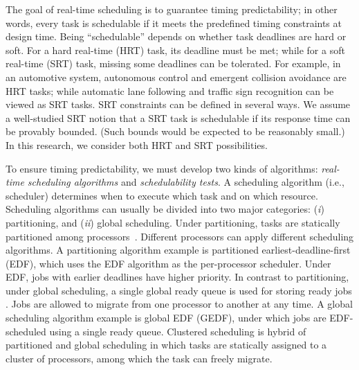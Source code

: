 The goal of real-time scheduling is to guarantee timing predictability; in other words, every task is schedulable if it meets the predefined timing constraints at design time. Being ``schedulable'' depends on whether task deadlines are hard or soft. %
For a hard real-time (HRT) task, its deadline must be met; while for a soft real-time (SRT) task, missing some deadlines can be tolerated. For example, in an automotive system, autonomous control and emergent collision avoidance  are  HRT tasks; while automatic lane following and traffic sign recognition can be viewed as SRT tasks. SRT constraints can be defined in several ways. We assume a well-studied SRT notion \cite{mills2010stochastic, erickson2012soft, johndissertation, BBBdissertation, devidissertation, leontyevdissertation} that a SRT task is schedulable if its response time can be provably bounded. (Such bounds would be expected to be reasonably small.) In this research, we consider both HRT and SRT possibilities.  

To ensure timing predictability, we must develop two kinds of algorithms: \textit{real-time scheduling algorithms} and \textit{schedulability tests}. A scheduling algorithm (i.e., scheduler) determines when to execute which task and on which resource. Scheduling algorithms can usually be divided into two major categories: (\textit{i}) partitioning, and (\textit{ii}) global scheduling. %
Under partitioning, tasks are statically partitioned among processors~\cite{andersson2003, baker2007, funk2005, Baruah2006a, chattopadhyay2011, baruah2005a}. %
Different processors can apply different scheduling algorithms. A partitioning algorithm example is partitioned earliest-deadline-first (EDF), which uses the EDF algorithm as the per-processor scheduler. Under EDF, jobs with earlier deadlines have higher priority. In contrast to partitioning, under global scheduling, a single global ready queue is used for storing ready jobs \cite{baruah2008, bertogna2011b, BC, devi2005}. Jobs are allowed to migrate from one processor to another at any time. A global scheduling algorithm example is global EDF (GEDF), under which jobs are EDF-scheduled using a single ready queue. 
 Clustered scheduling is hybrid of partitioned and global scheduling in which tasks are statically assigned to a cluster of processors, among which the task can freely migrate. %

